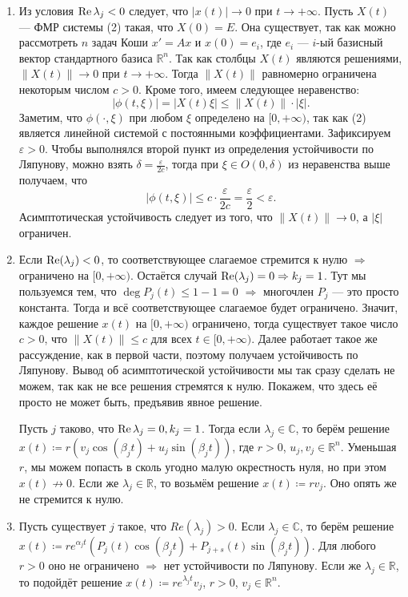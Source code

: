 \begin{enumerate}
\item Из условия $\operatorname{Re} \lambda_j < 0$ следует, что $|x(t)| \to 0$ при $t \to +\infty$. Пусть $X(t)$ --- ФМР системы (2) такая, что $X(0) = E$.
Она существует, так как можно рассмотреть $n$ задач Коши $x' = Ax$ и $x(0) = e_i$, где $e_i$ --- $i$-ый базисный вектор стандартного базиса $\mathbb R^n$.
Так как столбцы $X(t)$ являются решениями, $\|X(t)\| \to 0$ при $t \to +\infty$.
Тогда $\|X(t)\|$ равномерно ограничена некоторым числом $c > 0$. Кроме того, имеем следующее неравенство:
\[
    |\phi(t, \xi)| = |X(t) \xi| \le \| X(t) \| \cdot |\xi|.
\]
Заметим, что $\phi(\cdot, \xi)$ при любом $\xi$ определено на $[0, +\infty)$, так как (2) является линейной системой с постоянными коэффициентами. Зафиксируем $\varepsilon > 0$. Чтобы выполнялся второй пункт из определения устойчивости по Ляпунову, можно взять $\delta = \frac{\varepsilon}{2c}$, тогда
при $\xi \in O(0, \delta)$ из неравенства выше получаем, что 
\[
    |\phi(t, \xi)| \leq c \cdot \frac{\varepsilon}{2c} = \frac{\varepsilon}{2} < \varepsilon.
\]
Асимптотическая устойчивость следует из того, что $\|X(t)\| \to 0$, а $|\xi|$ ограничен.

\item Если $\operatorname{Re}(\lambda_j) < 0$, то соответствующее слагаемое стремится к нулю $\Rightarrow$ ограничено на $[0, +\infty)$.
Остаётся случай $\operatorname{Re}(\lambda_j) = 0 \Rightarrow k_j = 1$. Тут мы пользуемся тем, что $\deg P_j(t) \le 1 - 1 = 0$ $\Rightarrow$ многочлен $P_j$ --- это просто константа. Тогда и всё соответствующее слагаемое будет ограничено.
Значит, каждое решение $x(t)$ на $[0, +\infty)$ ограничено, тогда существует такое число $c > 0$, что $\|X(t)\| \le c$ для всех $t \in [0, +\infty)$. Далее работает такое же рассуждение, как в первой части, поэтому получаем устойчивость по Ляпунову. Вывод об асимптотической устойчивости мы так сразу сделать не можем, так как не все решения стремятся к нулю. Покажем, что здесь её просто не может быть, предъявив явное решение.

Пусть $j$ таково, что $\operatorname{Re} \lambda_j = 0, k_j = 1$. Тогда если $\lambda_j \in \mathbb C$, то берём решение $x(t) \coloneq r(v_j \cos(\beta_j t) + u_j\sin(\beta_j t))$, где $r > 0$, $u_j, v_j \in \mathbb R^n$. Уменьшая $r$, мы можем попасть в сколь угодно малую окрестность нуля, но при этом $x(t) \nrightarrow 0$. Если же $\lambda_j \in \mathbb R$, то возьмём решение $x(t) \coloneq rv_j$. Оно опять же не стремится к нулю.

\item Пусть существует $j$ такое, что $Re(\lambda_j) > 0$. Если $\lambda_j \in \mathbb C$, то берём решение $x(t) \coloneq re^{\alpha_j t} (P_j(t)\cos(\beta_j t) + P_{j+s}(t)\sin(\beta_j t))$. Для любого $r > 0$ оно не ограничено $\Rightarrow$ нет устойчивости по Ляпунову.
Если же $\lambda_j \in \mathbb R$, то подойдёт решение $x(t) \coloneq r e^{\lambda_j t}v_j$, $r > 0$, $v_j \in \mathbb R^n$.


\end{enumerate}

